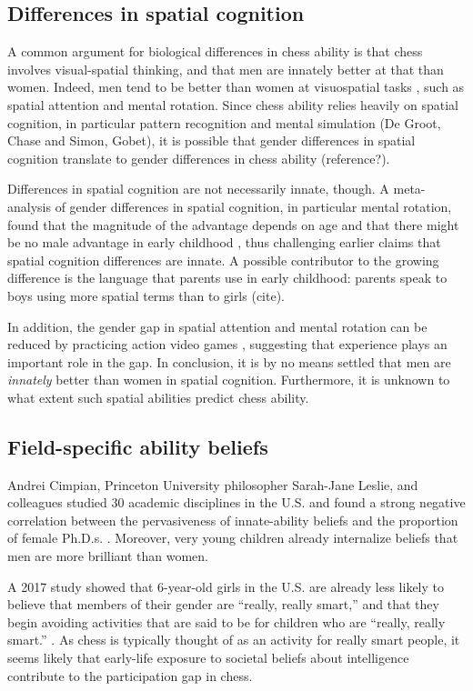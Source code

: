 \subsection*{Differences in spatial cognition}
A common argument for biological differences in chess ability is that chess involves visual-spatial thinking, and that men are innately better at that than women. Indeed, men tend to be better than women at visuospatial tasks \cite{kimura1999sex, terlecki2005important, voyer1995magnitude}, such as spatial attention and mental rotation.  Since chess ability relies heavily on spatial cognition, in particular pattern recognition and mental simulation (De Groot, Chase and Simon, Gobet), it is possible that gender differences in spatial cognition translate to gender differences in chess ability (reference?). 


Differences in spatial cognition are not necessarily innate, though. A meta-analysis of gender differences in spatial cognition, in particular mental rotation, found that the magnitude of the advantage depends on age and that there might be no male advantage in early childhood \cite{lauer2019development}, thus challenging earlier claims that spatial cognition differences are innate. A possible contributor to the growing difference is the language that parents use in early childhood: parents speak to boys using more spatial terms than to girls (cite). 

 In addition, the gender gap in spatial attention and mental rotation can be reduced by practicing action video games \cite{feng2007playing}, suggesting that experience plays an important role in the gap. In conclusion, it is by no means settled that men are {\it innately} better than women in spatial cognition. Furthermore, it is unknown to what extent such spatial abilities predict chess ability.

\subsection*{Field-specific ability beliefs}
Andrei Cimpian, Princeton University philosopher Sarah-Jane Leslie, and colleagues studied 30 academic disciplines in the U.S. and found a strong negative correlation between the pervasiveness of innate-ability beliefs and the proportion of female Ph.D.s. \cite{leslie2015expectations}. Moreover, very young children already internalize beliefs that men are more brilliant than women. 

A 2017 study showed that 6-year-old girls in the U.S. are already less likely to believe that members of their gender are “really, really smart,” and that they begin avoiding activities that are said to be for children who are “really, really smart.” \cite{bian2017gender}. As chess is typically thought of as an activity for really smart people, it seems likely that early-life exposure to societal beliefs about intelligence contribute to the participation gap in chess.

